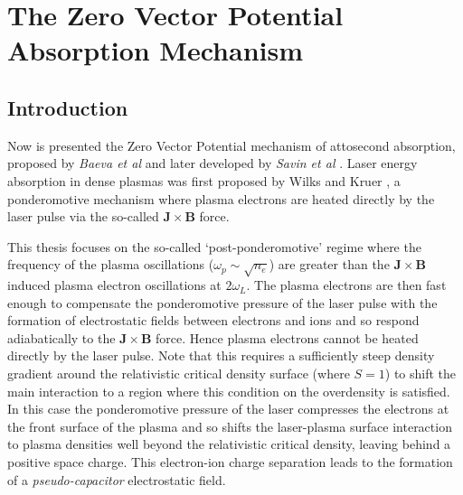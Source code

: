 \chapter{\label{ch:2-zvp}The Zero Vector Potential Absorption Mechanism}

\minitoc

\section{Introduction}
Now is presented the Zero Vector Potential mechanism of attosecond absorption, proposed by \textit{Baeva et al} \cite{baeva2011ZeroVectorPotential} and later developed by \textit{Savin et al} \cite{savin2017AttosecondscaleAbsorptionExtreme,savin2019EnergyAbsorptionLaserQED}. Laser energy absorption in dense plasmas was first proposed by Wilks and Kruer \cite{wilks1997}, a ponderomotive mechanism where plasma electrons are heated directly by the laser pulse via the so-called $\mathbf{J}\times \mathbf{B}$ force.


This thesis focuses on the so-called `post-ponderomotive' regime where the frequency of the plasma oscillations ($\omega_p \sim \sqrt{n_e}$) are greater than the $\mathbf{J}\times \mathbf{B}$ induced plasma electron oscillations at $2\omega_L$. The plasma electrons are then fast enough to compensate the ponderomotive pressure of the laser pulse with the formation of electrostatic fields between electrons and ions and so respond adiabatically to the $\mathbf{J}\times \mathbf{B}$ force. Hence plasma electrons cannot be heated directly by the laser pulse. Note that this requires a sufficiently steep density gradient around the relativistic critical density surface (where $S=1$) to shift the main interaction to a region where this condition on the overdensity is satisfied. In this case the ponderomotive pressure of the laser compresses the electrons at the front surface of the plasma and so shifts the laser-plasma surface interaction to plasma densities well beyond the relativistic critical density, leaving behind a positive space charge. This electron-ion charge separation leads to the formation of a \textit{pseudo-capacitor} electrostatic field.

